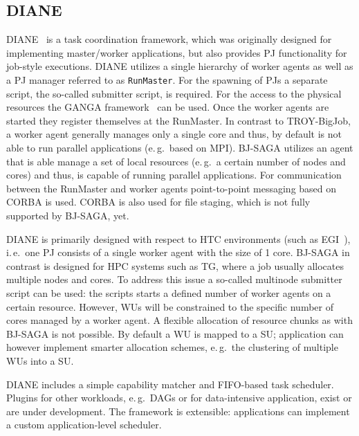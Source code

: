 \documentclass[conference,final]{IEEEtran}
\newcommand{\upp}{\vspace*{-0.5em}}
\begin{document}
\upp
\subsection{DIANE\upp\upp}

DIANE~\cite{Moscicki:908910} is a task coordination framework, which was
originally designed for implementing master/worker applications, but also
provides PJ functionality for job-style executions. DIANE utilizes a single
hierarchy of worker agents as well as a PJ manager referred to as
\texttt{RunMaster}.
For the spawning of PJs a separate script, the so-called submitter script, is
required. For the access to the physical resources the GANGA
framework~\cite{DBLP:journals/corr/abs-0902-2685} can be used.
Once the worker agents are started they register themselves at the RunMaster.
In contrast to TROY-BigJob, a worker agent generally manages only a single
core and thus, by default is not able to run parallel applications (e.\,g.\
based on MPI). BJ-SAGA utilizes an agent that is able manage a set of local
resources (e.\,g.\ a certain number of nodes and cores) and thus, is capable
of running parallel applications. For communication between the RunMaster and
worker agents point-to-point messaging based on CORBA is used. CORBA is also
used for file staging, which is not fully supported by BJ-SAGA, yet.

DIANE is primarily designed with respect to HTC environments (such as
EGI~\cite{egi}), i.\,e.\ one PJ consists of a single worker agent with the
size of 1 core. BJ-SAGA in contrast is designed for HPC systems such as TG,
where a job usually allocates multiple nodes and cores. To address this issue
a so-called multinode submitter script can be used: the scripts starts a
defined number of worker agents on a certain resource. However, WUs will be
constrained to the specific number of cores managed by a worker agent. A
flexible allocation of resource chunks as with BJ-SAGA is not possible. By
default a WU is mapped to a SU; application can however implement smarter
allocation schemes, e.\,g.\ the clustering of multiple WUs into a SU.

DIANE includes a simple capability matcher and FIFO-based task scheduler.
Plugins for other workloads, e.\,g.\ DAGs or for data-intensive
application, exist or are under development. The framework is extensible:
applications can implement a custom application-level scheduler.
\end{document}

